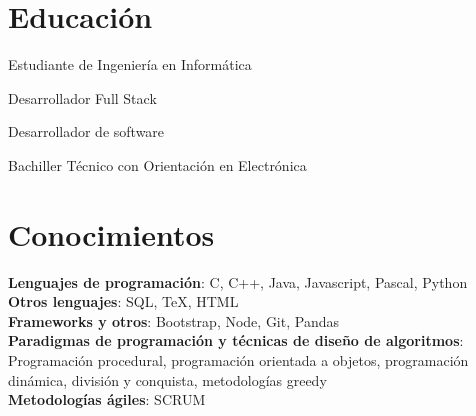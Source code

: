 \documentclass{resume}
\begin{document}
\section{Educación}

Estudiante de Ingeniería en Informática

Desarrollador Full Stack

Desarrollador de software

Bachiller Técnico con Orientación en Electrónica

\section{Conocimientos}
\smallskip
\textbf{Lenguajes de programación}: C, C++, Java, Javascript, Pascal, Python \\
\textbf{Otros lenguajes}: SQL, TeX, HTML \\
\textbf{Frameworks y otros}: Bootstrap, Node, Git, Pandas \\
\textbf{Paradigmas de programación y técnicas de diseño de algoritmos}: Programación procedural, programación orientada a objetos, programación dinámica, división y conquista, metodologías greedy \\
\textbf{Metodologías ágiles}: SCRUM \\
\end{document}

